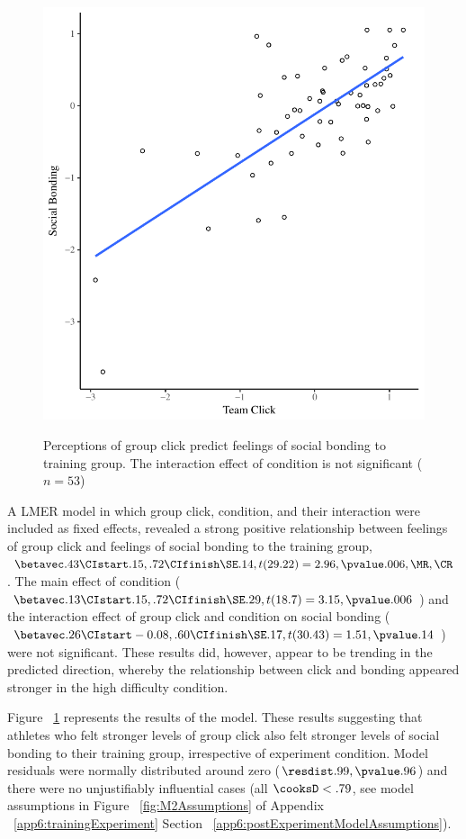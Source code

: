 \begin{figure}
  \centering
    \includegraphics[width=0.5\linewidth,keepaspectratio] {images/groupClickBondScatter}
    \label{fig:groupClickBondScatter}
    \caption{Perceptions of group click predict feelings of social bonding to training group. The interaction effect of condition is not significant ($n = 53$)}
\end{figure}

A LMER model in which group click, condition, and their interaction were included as fixed effects, revealed a strong positive relationship between feelings of group click and feelings of social bonding to the training group, $\betavec .43 \CIstart .15, .72 \CIfinish \SE .14, t(29.22) = 2.96, \pvalue .006, \MR , \CR $.
The main effect of condition ($\betavec .13 \CIstart .15, .72 \CIfinish \SE .29, t(18.7) = 3.15, \pvalue .006$) and the interaction effect of group click and condition on social bonding ($\betavec .26 \CIstart -0.08, .60 \CIfinish \SE .17, t(30.43) = 1.51, \pvalue .14$) were not significant.  These results did, however, appear to be trending in the predicted direction, whereby the relationship between click and bonding appeared stronger in the high difficulty condition.

Figure ~\ref{fig:groupClickBondScatter} represents the results of the model.  These results suggesting that athletes who felt stronger levels of group click also felt stronger levels of social bonding to their training group, irrespective of experiment condition.  Model residuals were normally distributed around zero ($\resdist .99, \pvalue .96$) and there were no unjustifiably influential cases (all $\cooksD < .79$, see model assumptions in Figure ~\ref{fig:M2Assumptions} of Appendix ~\ref{app6:trainingExperiment} Section ~\ref{app6:postExperimentModelAssumptions}).







